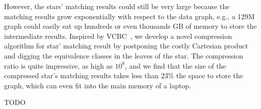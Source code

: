 However, the stars' matching results could still be very large because the matching results grow exponentially with respect to the data graph,
e.g., a 129M graph could easily eat up hundreds or even thousands GB of memory to store the intermediate results.
Inspired by VCBC~\cite{DBLP:journals/pvldb/QiaoZC17}, we develop a novel compression algorithm for star' matching result by postponing the costly Cartesian product and digging the equivalence classes in the leaves of the star.
The compression ratio is quite impressive, as high as $10^8$,
and we find that the size of the compressed star's matching results takes less than $23\%$ the space to store the graph,
which can even fit into the main memory of a laptop.

TODO
